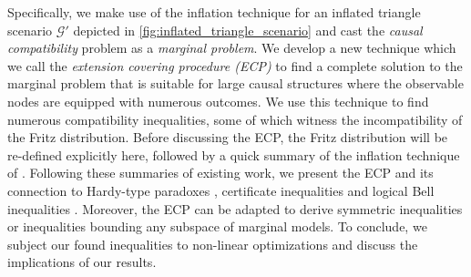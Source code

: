 \documentclass[aps, 10pt, english, twoside, pra, nofootinbib, longbibliography]{revtex4-1}
\theoremstyle{plain}
\theoremstyle{definition}
\theoremstyle{remark}
\newcommand{\graph}{\mathcal{G}}
\newcommand{\ts}{{\graph}}
\begin{document}
    Specifically, we make use of the inflation technique for an inflated triangle scenario $\ts'$ depicted in \cref{fig:inflated_triangle_scenario} and cast the \textit{causal compatibility} problem as a \textit{marginal problem}. We develop a new technique which we call the \textit{extension covering procedure (ECP)} to find a complete solution to the marginal problem that is suitable for large causal structures where the observable nodes are equipped with numerous outcomes. We use this technique to find numerous compatibility inequalities, some of which witness the incompatibility of the Fritz distribution. Before discussing the ECP, the Fritz distribution will be re-defined explicitly here, followed by a quick summary of the inflation technique of \cite{Inflation}. Following these summaries of existing work, we present the ECP and its connection to Hardy-type paradoxes \cite{Inflation,Liang_2011,Mansfield_2012}, certificate inequalities and logical Bell inequalities \cite{Abramsky_2011}. Moreover, the ECP can be adapted to derive symmetric inequalities or inequalities bounding any subspace of marginal models. To conclude, we subject our found inequalities to non-linear optimizations and discuss the implications of our results.
\end{document}
